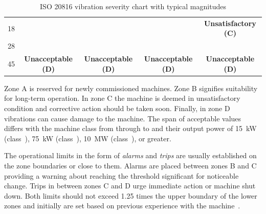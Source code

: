 \begin{table}[h]
\begin{adjustbox}{width=\columnwidth,center}
\begin{tabular}{|c|c|c|c|c|}
18                                                                                   & \cellcolor[HTML]{FD6864}                                                  & \cellcolor[HTML]{FD6864}                                                    & \cellcolor[HTML]{FD6864}                                                                     & \multirow{-2}{*}{\cellcolor[HTML]{F8A102}\textbf{Unsatisfactory (C)}}                         \\ \cline{1-1} \cline{5-5}
28                                                                                   & \cellcolor[HTML]{FD6864}                                                  & \cellcolor[HTML]{FD6864}                                                    & \cellcolor[HTML]{FD6864}                                                                     & \cellcolor[HTML]{FD6864}                                                                      \\ \cline{1-1}
45                                                                                   & \multirow{-5}{*}{\cellcolor[HTML]{FD6864}\textbf{Unacceptable (D)}}       & \multirow{-4}{*}{\cellcolor[HTML]{FD6864}\textbf{Unacceptable (D)}}         & \multirow{-3}{*}{\cellcolor[HTML]{FD6864}\textbf{Unacceptable (D)}}                          & \multirow{-2}{*}{\cellcolor[HTML]{FD6864}\textbf{Unacceptable (D)}}                           \\ \hline
\end{tabular}
\end{adjustbox}
\caption{ISO 20816 vibration severity chart with typical magnitudes \cite{noauthor_iso_2016}}
\label{tab:iso20816-vibration-severity}
\end{table}

Zone A is reserved for newly commissioned machines. Zone B signifies suitability for long-term operation. In zone C the machine is deemed in unsatisfactory condition and corrective action should be taken soon. Finally, in zone D vibrations can cause damage to the machine. The span of acceptable values differs with the machine class from  through to  and their output power of 15~kW (class~), 75~kW (class~), 10~MW (class~), or greater.

The operational limits in the form of \emph{alarms} and \emph{trips} are usually established on the zone boundaries or close to them. Alarms are placed between zones B and C providing a warning about reaching the threshold significant for noticeable change. Trips in between zones C and D urge immediate action or machine shut down. Both limits should not exceed 1.25 times the upper boundary of the lower zones and initially are set based on previous experience with the machine~\cite{noauthor_iso_2002}.

